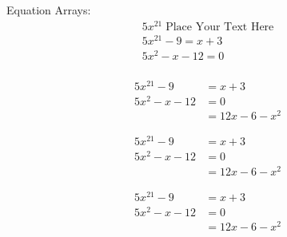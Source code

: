 \documentclass{article}
\begin{document}
Equation Arrays: 
\begin{align} %
    5x^{21} \; \text{Place Your Text Here}\\
     5x^{21}-9=x+3\\
     5x^2-x-12=0\\
\end{align}

\begin{align} %
     5x^{21}-9&=x+3\\ %
     5x^2-x-12&=0\\
     &=12x-6-x^2
\end{align}

\begin{align*} %
     5x^{21}-9&=x+3\\ %
     5x^2-x-12&=0\\
     &=12x-6-x^2
\end{align*}

\begin{align} %
     5x^{21}-9&=x+3\\ %
     5x^2-x-12&=0\\
     &=12x-6-x^2
\end{align}
\end{document}
